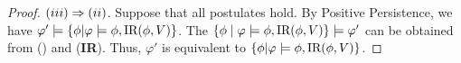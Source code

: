 \documentclass{article}
\begin{document}
\begin{proof}
 $(iii)\Rightarrow (ii)$. Suppose that all postulates hold. By Positive Persistence, we have $\varphi' \models \{\phi | \varphi \models \phi, \textrm{IR}(\phi, V)\}$.
 The  $\{\phi \mid \varphi \models \phi, \textrm{IR}(\phi, V)\} \models \varphi'$ can be obtained from (\W) and (\textbf{IR}).
 Thus, $\varphi'$ is equivalent to $\{\phi | \varphi \models \phi, \textrm{IR}(\phi, V)\}$.
 \end{proof}
\end{document}
